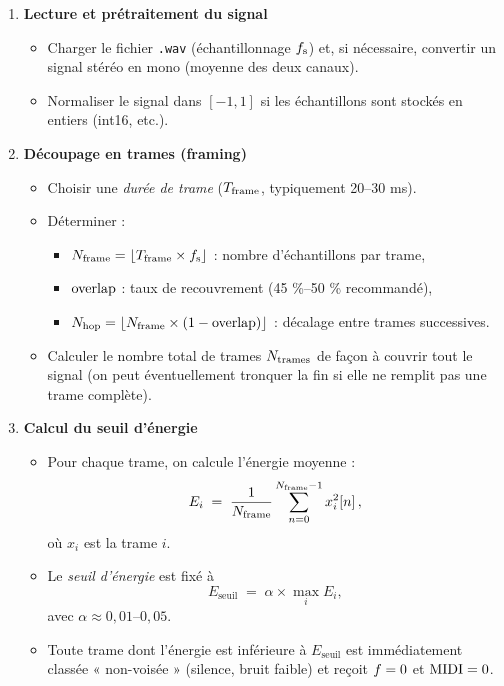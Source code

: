 \begin{enumerate}
  \item \textbf{Lecture et prétraitement du signal }  
    \begin{itemize}
      \item Charger le fichier \texttt{.wav} (échantillonnage \(f_\mathrm{s}\)) et, si nécessaire, convertir un signal stéréo en mono (moyenne des deux canaux).  
      \item Normaliser le signal dans \([-1, 1]\) si les échantillons sont stockés en entiers (int16, etc.).  
    \end{itemize}
  \item \textbf{Découpage en trames (framing) }  
    \begin{itemize}
      \item Choisir une \emph{durée de trame} (\(T_\mathrm{frame}\), typiquement 20–30 ms).  
      \item Déterminer :  
        \begin{itemize}
          \item \(N_\mathrm{frame} = \lfloor T_\mathrm{frame} \times f_\mathrm{s}\rfloor\) : nombre d’échantillons par trame,  
          \item \(\mathrm{overlap}\) : taux de recouvrement (45 \%–50 \% recommandé),  
          \item \(N_\mathrm{hop} = \lfloor N_\mathrm{frame} \times (1 - \mathrm{overlap})\rfloor\) : décalage entre trames successives.  
        \end{itemize}
      \item Calculer le nombre total de trames \(N_\mathrm{trames}\) de façon à couvrir tout le signal (on peut éventuellement tronquer la fin si elle ne remplit pas une trame complète).  
    \end{itemize}
  \item \textbf{Calcul du seuil d’énergie }  
    \begin{itemize}
      \item Pour chaque trame, on calcule l’énergie moyenne :  
        \[
          E_i \;=\; \frac{1}{N_\mathrm{frame}}\sum_{n=0}^{N_\mathrm{frame}-1} x^2_i[n]\,,
        \]
        où \(x_i\) est la trame \(i\).  
      \item Le \emph{seuil d’énergie} est fixé à
        \[
          E_{\text{seuil}} \;=\; \alpha \times \max_i E_i,
        \]
        avec \(\alpha\approx 0{,}01\text{--}0{,}05\).  
      \item Toute trame dont l’énergie est inférieure à \(E_{\text{seuil}}\) est immédiatement classée « non-voisée » (silence, bruit faible) et reçoit \(f=0\) et \(\mathrm{MIDI}=0\).  

\end{itemize}
\end{enumerate}
